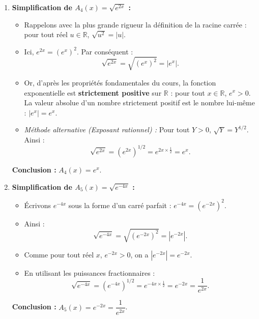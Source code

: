 \documentclass[11pt,a4paper]{article}
\newcommand{\R}{\mathbb{R}}
\begin{document}
\begin{correctionbox}[Exercice 1]
\begin{enumerate}[label=\textbf{\arabic*.}]
    \item \textbf{Simplification de $A_4(x) = \sqrt{e^{2x}}$ :}
    \begin{itemize}
        \item Rappelons avec la plus grande rigueur la définition de la racine carrée : pour tout réel $u \in \R$, $\sqrt{u^2} = |u|$.
        \item Ici, $e^{2x} = (e^x)^2$. Par conséquent :
        \[
        \sqrt{e^{2x}} = \sqrt{(e^x)^2} = |e^x|.
        \]
        \item Or, d'après les propriétés fondamentales du cours, la fonction exponentielle est \textbf{strictement positive} sur $\R$ : pour tout $x \in \R$, $e^x > 0$. La valeur absolue d'un nombre strictement positif est le nombre lui-même : $|e^x| = e^x$.
        \item \textit{Méthode alternative (Exposant rationnel) :}
        Pour tout $Y > 0$, $\sqrt{Y} = Y^{1/2}$. Ainsi :
        \[
        \sqrt{e^{2x}} = \left(e^{2x}\right)^{1/2} = e^{2x \times \frac{1}{2}} = e^x.
        \]
    \end{itemize}
    \textbf{Conclusion :} $\boxed{A_4(x) = e^x}$.

    \item \textbf{Simplification de $A_5(x) = \sqrt{e^{-4x}}$ :}
    \begin{itemize}
        \item Écrivons $e^{-4x}$ sous la forme d'un carré parfait : $e^{-4x} = (e^{-2x})^2$.
        \item Ainsi :
        \[
        \sqrt{e^{-4x}} = \sqrt{(e^{-2x})^2} = |e^{-2x}|.
        \]
        \item Comme pour tout réel $x$, $e^{-2x} > 0$, on a $|e^{-2x}| = e^{-2x}$.
        \item En utilisant les puissances fractionnaires :
        \[
        \sqrt{e^{-4x}} = \left(e^{-4x}\right)^{1/2} = e^{-4x \times \frac{1}{2}} = e^{-2x} = \frac{1}{e^{2x}}.
        \]
    \end{itemize}
    \textbf{Conclusion :} $\boxed{A_5(x) = e^{-2x} = \dfrac{1}{e^{2x}}}$.


\end{enumerate}
\end{correctionbox}
\end{document}
